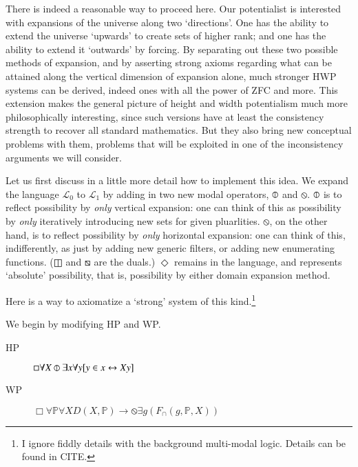 \documentclass{article}
\begin{document}
There is indeed a reasonable way to proceed here. Our potentialist is interested 
with expansions of the universe along two `directions'. One has the ability 
to extend the universe `upwards' to create sets of higher rank; and one has the ability 
to extend it `outwards' by forcing. By separating out these two possible methods of 
expansion, and by asserting strong axioms regarding what can be attained along the 
vertical dimension of expansion alone, much stronger HWP systems can be derived,
indeed ones with all the power of ZFC and more. This extension makes the general 
picture of height and width potentialism much more philosophically interesting, since 
such versions have at least the consistency strength to recover all standard mathematics.
But they also bring new conceptual problems with them, problems that will be exploited 
in one of the inconsistency arguments we will consider. 

Let us first discuss in a little more detail how to implement this idea. We expand 
the language $\mathcal{L}_0$ to $\mathcal{L}_1$ by adding in two new modal operators, 
$\circledbar$ and $\circledbslash$. $\circledbar$ is to reflect possibility by \emph{only} vertical expansion: 
one can think of this as possibility by \emph{only} iteratively introducing new sets 
for given pluarlities. $\circledbslash$, on the other hand, is to reflect possibility by \emph{only}
horizontal expansion: one can think of this, indifferently, as just by adding 
new generic filters, or adding new enumerating functions. ($\boxbar$ and $\boxbslash$
are the duals.) $\Diamond$ remains in the 
language, and represents `absolute' possibility, that is, possibility by either 
domain expansion method. 

Here is a way to axiomatize a `strong' system of this kind.\footnote{I ignore 
fiddly details with the background multi-modal logic. Details can be found in CITE.}

We begin by modifying HP and WP. 
\begin{description}
    \item[HP] $\Box \forall X \circledbar \exists x \forall y[y \in x \leftrightarrow Xy]$
\end{description}

\begin{description}
    \item[WP] $\Box \forall \mathbb{P} \forall X D(X, \mathbb{P}) \rightarrow \circledbslash \exists g(F_\cap(g, \mathbb{P}, X)) $
\end{description}
\end{document}
